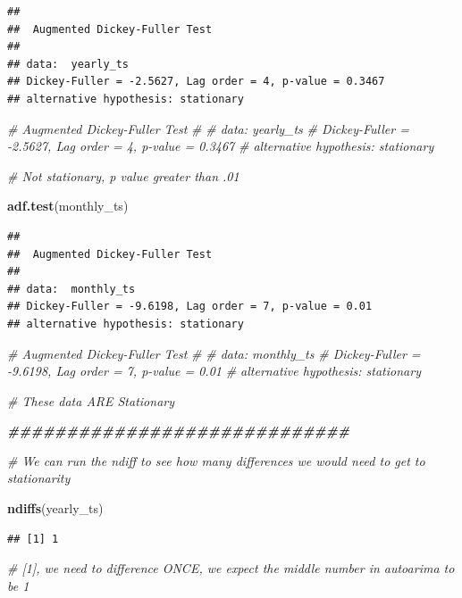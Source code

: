 \documentclass[
]{article}
\newenvironment{Shaded}{\begin{snugshade}}{\end{snugshade}}
\newcommand{\CommentTok}[1]{\textcolor[rgb]{0.56,0.35,0.01}{\textit{#1}}}
\newcommand{\DocumentationTok}[1]{\textcolor[rgb]{0.56,0.35,0.01}{\textbf{\textit{#1}}}}
\newcommand{\FunctionTok}[1]{\textcolor[rgb]{0.13,0.29,0.53}{\textbf{#1}}}
\newcommand{\NormalTok}[1]{#1}
\begin{document}
\begin{verbatim}
## 
##  Augmented Dickey-Fuller Test
## 
## data:  yearly_ts
## Dickey-Fuller = -2.5627, Lag order = 4, p-value = 0.3467
## alternative hypothesis: stationary
\end{verbatim}

\begin{Shaded}
\begin{Highlighting}[]
\CommentTok{\# Augmented Dickey{-}Fuller Test}
\CommentTok{\# }
\CommentTok{\# data:  yearly\_ts}
\CommentTok{\# Dickey{-}Fuller = {-}2.5627, Lag order = 4, p{-}value = 0.3467}
\CommentTok{\# alternative hypothesis: stationary}

\CommentTok{\# Not stationary, p value greater than .01 }


\FunctionTok{adf.test}\NormalTok{(monthly\_ts)}
\end{Highlighting}
\end{Shaded}

\begin{verbatim}
## 
##  Augmented Dickey-Fuller Test
## 
## data:  monthly_ts
## Dickey-Fuller = -9.6198, Lag order = 7, p-value = 0.01
## alternative hypothesis: stationary
\end{verbatim}

\begin{Shaded}
\begin{Highlighting}[]
\CommentTok{\# Augmented Dickey{-}Fuller Test}
\CommentTok{\# }
\CommentTok{\# data:  monthly\_ts}
\CommentTok{\# Dickey{-}Fuller = {-}9.6198, Lag order = 7, p{-}value = 0.01}
\CommentTok{\# alternative hypothesis: stationary}

\CommentTok{\# These data ARE Stationary }

\DocumentationTok{\#\#\#\#\#\#\#\#\#\#\#\#\#\#\#\#\#\#\#\#\#\#\#\#\#\#\#\#\#}

\CommentTok{\# We can run the ndiff to see how many differences we would need to get to stationarity }

\FunctionTok{ndiffs}\NormalTok{(yearly\_ts)}
\end{Highlighting}
\end{Shaded}

\begin{verbatim}
## [1] 1
\end{verbatim}

\begin{Shaded}
\begin{Highlighting}[]
\CommentTok{\# [1], we need to difference ONCE, we expect the middle number in autoarima to be 1 }
\end{Highlighting}
\end{Shaded}
\end{document}
